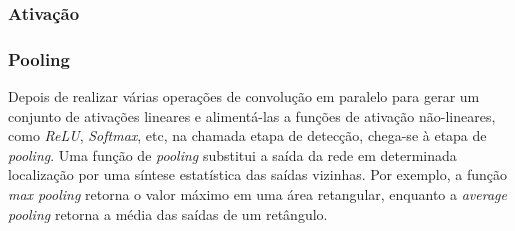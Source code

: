 \subsubsection{Ativação}


\subsubsection{Pooling}

Depois de realizar várias operações de convolução em paralelo para gerar um conjunto de ativações lineares e alimentá-las a funções de ativação não-lineares, como \emph{ReLU}, \emph{Softmax}, etc, na chamada etapa de detecção, chega-se à etapa de \emph{pooling}. Uma função de \emph{pooling} substitui a saída da rede em determinada localização por uma síntese estatística das saídas vizinhas. Por exemplo, a função \emph{max pooling} retorna o valor máximo em uma área retangular, enquanto a \emph{average pooling} retorna a média das saídas de um retângulo. %
